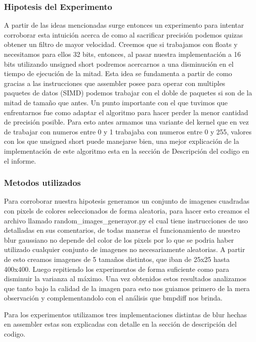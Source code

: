 \subsubsection{Hipotesis del Experimento}

A partir de las ideas mencionadas surge entonces un experimento para intentar
corroborar esta intuición acerca de como al sacrificar precisión podemos quizas
obtener un filtro de mayor velocidad. Creemos que si trabajamos con floats y
necesitamos para ellos 32 bits, entonces, al pasar nuestra implementación a 16
bits utilizando unsigned short podremos acercarnos a una disminución en el
tiempo de ejecución de la mitad. Esta idea se fundamenta a partir de como
gracias a las instrucciones que assembler posee para operar con multiples
paquetes de datos (SIMD) podemos trabajar con el doble de paquetes si son de la
mitad de tamaño que antes. Un punto importante con el que tuvimos que
enfrentarnos fue como adaptar el algoritmo para hacer perder la menor cantidad
de precisión posible. Para esto antes armamos una variante del kernel que en vez
de trabajar con numeros entre 0 y 1 trabajaba con numeros entre 0 y 255, valores
con los que unsigned short puede manejarse bien, una mejor explicación de la
implementación de este algoritmo esta en la sección de Descripción del codigo en
el informe.

\subsubsection{Metodos utilizados}

Para corroborar nuestra hipotesis generamos un conjunto de imagenes cuadradas
con pixels de colores seleccionados de forma aleatoria, para hacer esto creamos
el archivo llamado random\_images\_generayor.py el cual tiene instrucciones de
uso detalladas en sus comentarios, de todas maneras el funcionamiento de nuestro
blur gaussiano no depende del color de los pixels por lo que se podria haber
utilizado cualquier conjunto de imagenes no necesariamente aleatorias. A partir
de esto creamos imagenes de 5 tamaños distintos, que iban de 25x25 hasta
400x400. Luego repitiendo los experimentos de forma suficiente como para
disminuir la varianza al máximo. Una vez obtenidos estos resultados analizamos
que tanto bajo la calidad de la imagen para esto nos guiamos primero de la mera
observación y complementandolo con el análisis que bmpdiff nos brinda.

Para los experimentos utilizamos tres implementaciones distintas de blur hechas
en assembler estas son explicadas con detalle en la sección de descripción del
codigo.

